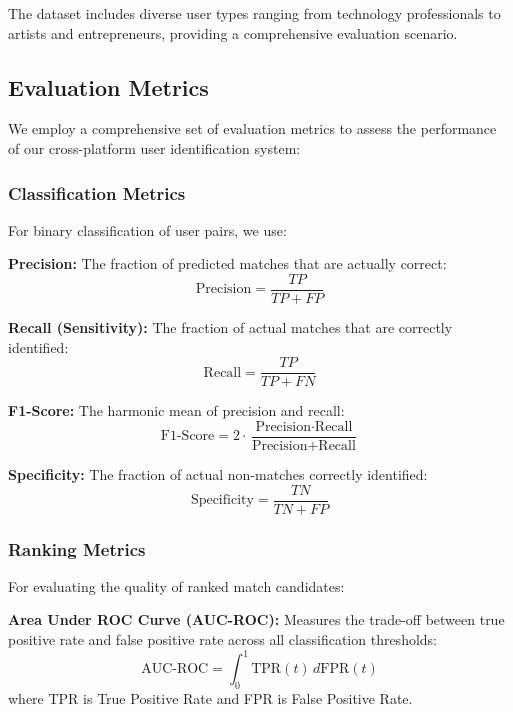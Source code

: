 \documentclass[conference]{IEEEtran}
\begin{document}
The dataset includes diverse user types ranging from technology professionals to artists and entrepreneurs, providing a comprehensive evaluation scenario.

\subsection{Evaluation Metrics}

We employ a comprehensive set of evaluation metrics to assess the performance of our cross-platform user identification system:

\subsubsection{Classification Metrics}
For binary classification of user pairs, we use:

\textbf{Precision:} The fraction of predicted matches that are actually correct:
\begin{equation}
\text{Precision} = \frac{TP}{TP + FP}
\end{equation}

\textbf{Recall (Sensitivity):} The fraction of actual matches that are correctly identified:
\begin{equation}
\text{Recall} = \frac{TP}{TP + FN}
\end{equation}

\textbf{F1-Score:} The harmonic mean of precision and recall:
\begin{equation}
\text{F1-Score} = 2 \cdot \frac{\text{Precision} \cdot \text{Recall}}{\text{Precision} + \text{Recall}}
\end{equation}

\textbf{Specificity:} The fraction of actual non-matches correctly identified:
\begin{equation}
\text{Specificity} = \frac{TN}{TN + FP}
\end{equation}

\subsubsection{Ranking Metrics}
For evaluating the quality of ranked match candidates:

\textbf{Area Under ROC Curve (AUC-ROC):} Measures the trade-off between true positive rate and false positive rate across all classification thresholds:
\begin{equation}
\text{AUC-ROC} = \int_0^1 \text{TPR}(t) \, d\text{FPR}(t)
\end{equation}
where TPR is True Positive Rate and FPR is False Positive Rate.
\end{document}
